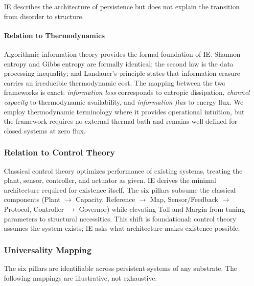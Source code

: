 IE describes the architecture of persistence but does not explain the transition from disorder to structure.

\paragraph{Relation to Thermodynamics}
\label{subsec:thermodynamics}
Algorithmic information theory provides the formal foundation of IE. Shannon entropy and Gibbs entropy are formally identical; the second law is the data processing inequality; and Landauer's principle states that information erasure carries an irreducible thermodynamic cost. The mapping 
between the two frameworks is exact: \emph{information loss} corresponds to entropic dissipation, \emph{channel capacity} to thermodynamic availability, and \emph{information flux} to energy flux. We employ thermodynamic terminology where it provides operational intuition, but the framework requires no external thermal bath and remains well-defined for closed systems at zero flux.

\subsubsection{Relation to Control Theory} 
\label{subsec:control_theory}
Classical control theory optimizes performance of existing systems, treating the plant, sensor, controller, and actuator as given.\cite{dorf_modern_2017} IE derives the minimal architecture required for existence itself. The six pillars subsume the classical components (Plant $\to$ Capacity, Reference $\to$ Map, Sensor/Feedback $\to$ Protocol, Controller $\to$ Governor) while elevating Toll and Margin from tuning parameters to structural necessities. This shift is foundational: control theory assumes the system exists; IE asks what architecture makes existence possible.


\subsubsection{Universality Mapping}
\label{subsec:universality_mapping}
The six pillars are identifiable across persistent systems of any substrate.  The following mappings are illustrative, not exhaustive:


